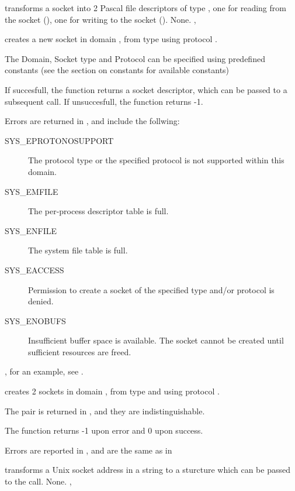 { transforms a socket  into 2 Pascal file
descriptors of type , one for reading from the socket
(), one for writing to the socket ().}
{None.}
{, }



{ creates a new socket in domain , from type
 using protocol .

The Domain, Socket type and Protocol can be specified using predefined
constants (see the section on constants for available constants)

If succesfull, the function returns a socket descriptor, which can be passed
to a subsequent  call. If unsuccesfull, the function returns -1.
}
{Errors are returned in , and include the follwing:
\begin{description}
\item[SYS\_EPROTONOSUPPORT]
The protocol type or the specified protocol is not
supported within this domain.
\item[SYS\_EMFILE]
The per-process descriptor table is full.
\item[SYS\_ENFILE]
The system file table is full.
\item[SYS\_EACCESS]
 Permission  to  create  a  socket of the specified
 type and/or protocol is denied.
\item[SYS\_ENOBUFS]
 Insufficient  buffer  space  is  available.    The
 socket   cannot   be   created   until  sufficient
 resources are freed.
\end{description}}
{, }
for an example, see .

{ creates 2 sockets in domain , from type
 and using protocol .

The pair is returned in , and they are indistinguishable.

The function returns -1 upon error and 0 upon success.
}
{Errors are reported in , and are the same as in }

{ transforms a Unix socket address in a string to a
 sturcture which can be passed to the  call.
}
{None.}
{, }
